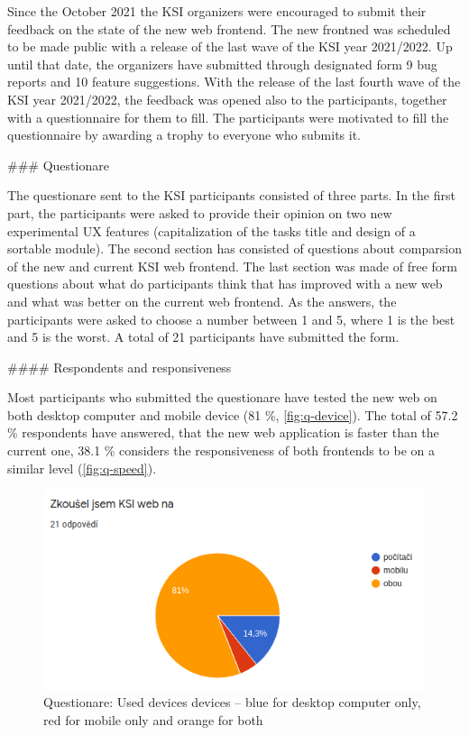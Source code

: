 \documentclass[
  digital, %
  oneside, %
  lof,     %
  lot,     %
]{fithesis4}
\begin{document}
{Since the October 2021 the KSI organizers were encouraged to submit their feedback on the state of the new web frontend. The new frontned was scheduled to be made public with a release of the last wave of the KSI year 2021/2022. Up until that date, the organizers have submitted through designated form 9 bug reports and 10 feature suggestions. With the release of the last fourth wave of the KSI year 2021/2022, the feedback was opened also to the participants, together with a questionnaire for them to fill. The participants were motivated to fill the questionnaire by awarding a trophy to everyone who submits it.

### Questionare

The questionare sent to the KSI participants consisted of three parts. In the first part, the participants were asked to provide their opinion on two new experimental UX features (capitalization of the tasks title and design of a sortable module). The second section has consisted of questions about comparsion of the new and current KSI web frontend. The last section was made of free form questions about what do participants think that has improved with a new web and what was better on the current web frontend. As the answers, the participants were asked to choose a number between 1 and 5, where 1 is the best and 5 is the worst. A total of 21 participants have submitted the form.

#### Respondents and responsiveness

Most participants who submitted the questionare have tested the new web on both desktop computer and mobile device (81 \%, \autoref{fig:q-device}). The total of 57.2 \% respondents have answered, that the new web application is faster than the current one, 38.1 \% considers the responsiveness of both frontends to be on a similar level (\autoref{fig:q-speed}).

\begin{figure}
\includegraphics[width=\textwidth]{assets/img/questionare/device}
\caption{Questionare: Used devices devices -- blue for desktop computer only, red for mobile only and orange for both}
\label{fig:q-device}
\end{figure}

}
\end{document}
